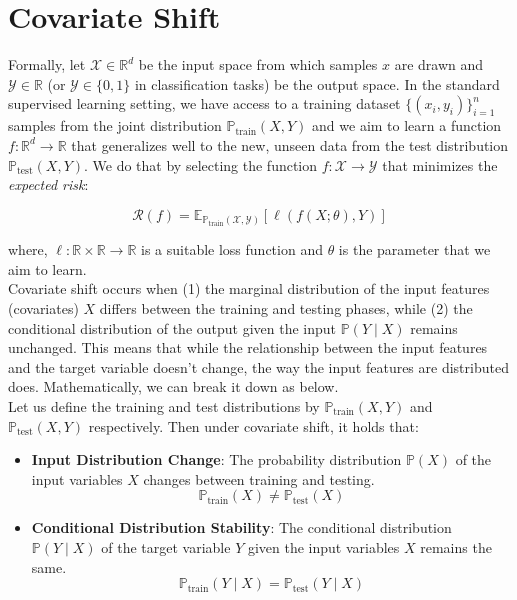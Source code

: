 \chapter{Covariate Shift}\label{chp:2}

Formally, let $\mathcal{X} \in \mathbb{R}^d$ be the input space from which samples $x$ are drawn and $\mathcal{Y} \in \mathbb{R}$ (or $\mathcal{Y} \in \{0,1\}$ in classification tasks) be the output space. In the standard supervised learning setting, we have access to a training dataset $\{(x_i, y_i)\}_{i=1}^n$ samples from the joint distribution $\mathbb{P}_{\text{train}}(X, Y)$ and we aim to learn a function $f: \mathbb{R}^d \rightarrow \mathbb{R}$ that generalizes well to the new, unseen data from the test distribution $\mathbb{P}_{\text{test}}(X, Y)$. We do that by selecting the function $f: \mathcal{X} \to \mathcal{Y}$ that minimizes the \emph{expected risk}:

$$\mathcal{R}(f) = \mathbb{E}_{\mathbb{P}_{\text{train}}(\mathcal{X},\mathcal{Y})}[\ell(f(X; \theta), Y)]$$

where, $\ell: \mathbb{R} \times \mathbb{R} \to \mathbb{R}$ is a suitable loss function and $\theta$ is the parameter that we aim to learn.\\

Covariate shift occurs when (1) the marginal distribution of the input features (covariates) $X$ differs between the training and testing phases, while (2) the conditional distribution of the output given the input $\mathbb{P}(Y \mid X)$ remains unchanged. This means that while the relationship between the input features and the target variable doesn't change, the way the input features are distributed does. Mathematically, we can break it down as below.\\

Let us define the training and test distributions by $\mathbb{P}_{\text{train}}(X, Y)$ and $\mathbb{P}_{\text{test}}(X, Y)$ respectively. Then under covariate shift, it holds that:

\begin{itemize}
    \item \textbf{Input Distribution Change}: The probability distribution $\mathbb{P}(X)$ of the input variables $X$ changes between training and testing.
    $$\mathbb{P}_{\text{train}} (X) \neq \mathbb{P}_{\text{test}} (X)$$
    \item \textbf{Conditional Distribution Stability}: The conditional distribution $\mathbb{P}(Y \mid X)$ of the target variable $Y$ given the input variables $X$ remains the same.
    $$\mathbb{P}_{\text{train}}(Y \mid X) = \mathbb{P}_{\text{test}}(Y \mid X)$$
\end{itemize}

